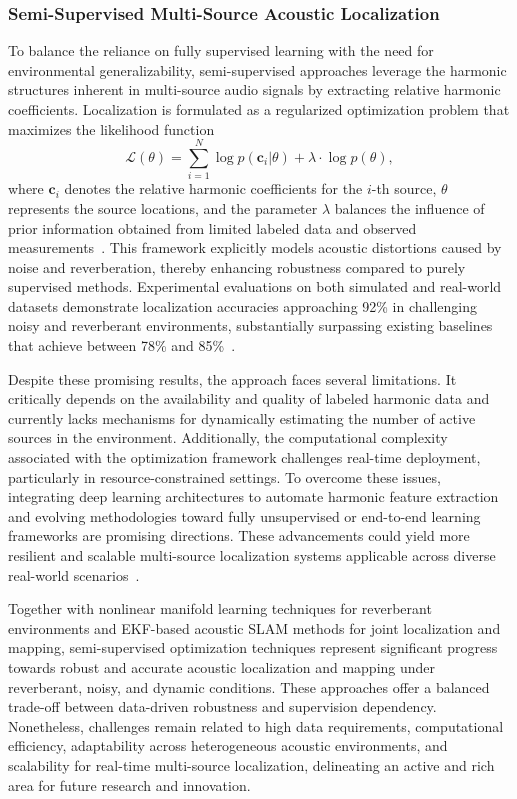 \documentclass[sigconf]{acmart}
\begin{document}
\subsubsection{Semi-Supervised Multi-Source Acoustic Localization}

To balance the reliance on fully supervised learning with the need for environmental generalizability, semi-supervised approaches leverage the harmonic structures inherent in multi-source audio signals by extracting relative harmonic coefficients. Localization is formulated as a regularized optimization problem that maximizes the likelihood function
\[
\mathcal{L}(\theta) = \sum_{i=1}^N \log p(\mathbf{c}_i | \theta) + \lambda \cdot \log p(\theta),
\]
where $\mathbf{c}_i$ denotes the relative harmonic coefficients for the $i$-th source, $\theta$ represents the source locations, and the parameter $\lambda$ balances the influence of prior information obtained from limited labeled data and observed measurements~\cite{ref52}. This framework explicitly models acoustic distortions caused by noise and reverberation, thereby enhancing robustness compared to purely supervised methods. Experimental evaluations on both simulated and real-world datasets demonstrate localization accuracies approaching 92\% in challenging noisy and reverberant environments, substantially surpassing existing baselines that achieve between 78\% and 85\%~\cite{ref52}.

Despite these promising results, the approach faces several limitations. It critically depends on the availability and quality of labeled harmonic data and currently lacks mechanisms for dynamically estimating the number of active sources in the environment. Additionally, the computational complexity associated with the optimization framework challenges real-time deployment, particularly in resource-constrained settings. To overcome these issues, integrating deep learning architectures to automate harmonic feature extraction and evolving methodologies toward fully unsupervised or end-to-end learning frameworks are promising directions. These advancements could yield more resilient and scalable multi-source localization systems applicable across diverse real-world scenarios~\cite{ref52}.

Together with nonlinear manifold learning techniques for reverberant environments and EKF-based acoustic SLAM methods for joint localization and mapping, semi-supervised optimization techniques represent significant progress towards robust and accurate acoustic localization and mapping under reverberant, noisy, and dynamic conditions. These approaches offer a balanced trade-off between data-driven robustness and supervision dependency. Nonetheless, challenges remain related to high data requirements, computational efficiency, adaptability across heterogeneous acoustic environments, and scalability for real-time multi-source localization, delineating an active and rich area for future research and innovation.
\end{document}
